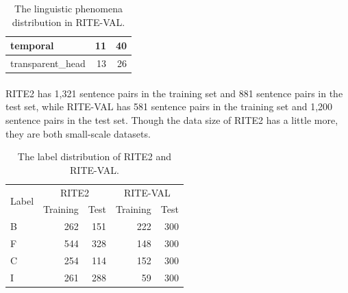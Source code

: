 \documentclass[12pt]{article}
\begin{document}
\begin{CJK*}{UTF8}{bkai}
\begin{spacing}{1.77}
\begin{table}[ht!]
{\begin{tabular}{|l|r|r|}
      temporal & 11 & 40 \\ \hline
      transparent\_head & 13 & 26 \\ \hline
    \end{tabular}
  }
  \quad
  \caption{The linguistic phenomena distribution in RITE-VAL.}
  \label{tab:linguistic_phenomenon}
\end{table}

\paragraph{}
RITE2 has 1,321 sentence pairs in the training set and 881 sentence pairs in the test set, while RITE-VAL has 581 sentence pairs in the training set and 1,200 sentence pairs in the test set. Though the data size of RITE2 has a little more, they are both small-scale datasets.

\begin{table}[ht!]
  \centering
  \begin{tabular}{|l|r|r|r|r|}
    \hline
    \multirow{2}{*}{Label} & \multicolumn{2}{c|}{RITE2} & \multicolumn{2}{c|}{RITE-VAL} \\
    \cline{2-5}
    & Training & Test & Training & Test \\ \hline
    B & 262 & 151 & 222 & 300 \\ \hline
    F & 544 & 328 & 148 & 300 \\ \hline
    C & 254 & 114 & 152 & 300 \\ \hline
    I & 261 & 288 & 59 & 300 \\ \hline
  \end{tabular}
  \caption{The label distribution of RITE2 and RITE-VAL.}
\end{table}


\end{spacing}
\end{CJK*}
\end{document}
